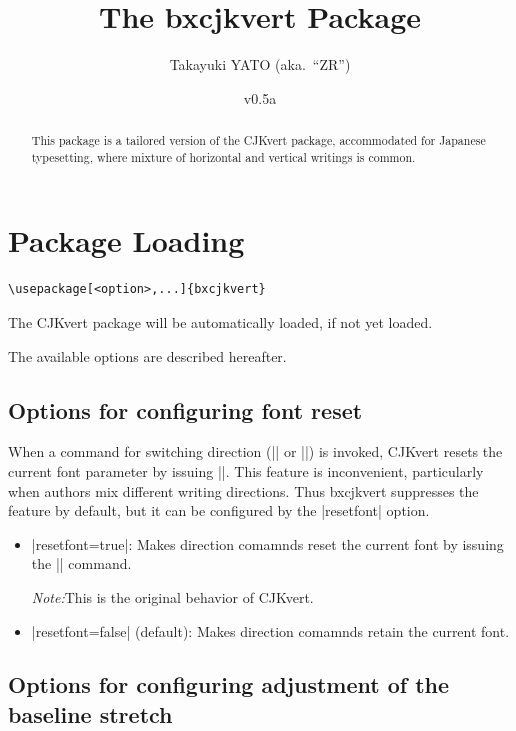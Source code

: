\documentclass[a4paper]{article}
\newcommand{\PkgVersion}{0.5a}
\newcommand{\PkgDate}{2026/03/31}
\newcommand{\Pkg}[1]{\textsf{#1}}
\newcommand{\Note}{\par\noindent \emph{Note:}\quad}
\newcommand{\Means}{:\hspace{1em plus 1em}}
\begin{document}
\title{The \Pkg{bxcjkvert} Package}
\author{Takayuki YATO (aka.~``ZR'')}
\date{v\PkgVersion\quad[\PkgDate]}
\maketitle

\begin{abstract}
This package is a tailored version of the \Pkg{CJKvert} package,
accommodated for Japanese typesetting,
where mixture of horizontal and vertical writings is common.
\end{abstract}

\tableofcontents

\section{Package Loading}
\label{sec:loading}

\begin{verbatim}
\usepackage[<option>,...]{bxcjkvert}
\end{verbatim}

The \Pkg{CJKvert} package will be automatically loaded,
if not yet loaded.

The available options are described hereafter.

\subsection{Options for configuring font reset}

When a command for switching direction (|\CJKhorz| or |\CJKvert|)
is invoked, \Pkg{CJKvert} resets the current font parameter
by issuing |\normalfont|.
This feature is inconvenient, particularly
when authors mix different writing directions.
Thus \Pkg{bxcjkvert} suppresses the feature by default,
but it can be configured by the |resetfont| option.

\begin{itemize}
\item |resetfont=true|\Means
  Makes direction comamnds reset the current font by issuing
  the |\normalfont| command.
  \Note This is the original behavior of \Pkg{CJKvert}.
\item |resetfont=false| (default)\Means
  Makes direction comamnds retain the current font.
\end{itemize}

\subsection{Options for configuring adjustment of the baseline stretch}
\end{document}
